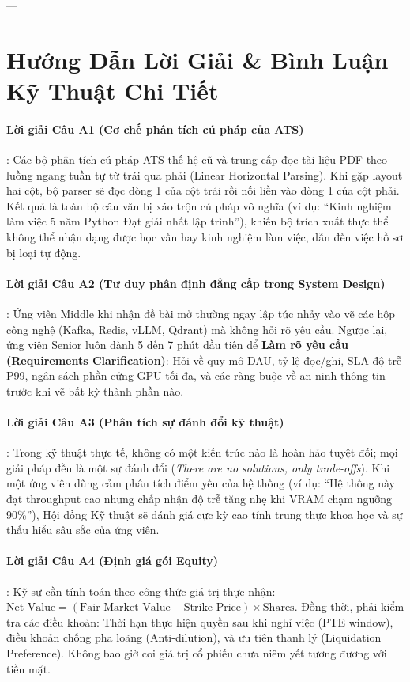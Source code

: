 ---

\section{Hướng Dẫn Lời Giải \& Bình Luận Kỹ Thuật Chi Tiết}
\label{sec:ch15-solutions}

\paragraph{Lời giải Câu A1 (Cơ chế phân tích cú pháp của ATS)}:
Các bộ phân tích cú pháp ATS thế hệ cũ và trung cấp đọc tài liệu PDF theo luồng ngang tuần tự từ trái qua phải (Linear Horizontal Parsing).
Khi gặp layout hai cột, bộ parser sẽ đọc dòng 1 của cột trái rồi nối liền vào dòng 1 của cột phải. Kết quả là toàn bộ câu văn bị xáo trộn cú pháp vô nghĩa (ví dụ: ``Kinh nghiệm làm việc 5 năm Python Đạt giải nhất lập trình''), khiến bộ trích xuất thực thể không thể nhận dạng được học vấn hay kinh nghiệm làm việc, dẫn đến việc hồ sơ bị loại tự động.

\paragraph{Lời giải Câu A2 (Tư duy phân định đẳng cấp trong System Design)}:
Ứng viên Middle khi nhận đề bài mở thường ngay lập tức nhảy vào vẽ các hộp công nghệ (Kafka, Redis, vLLM, Qdrant) mà không hỏi rõ yêu cầu.
Ngược lại, ứng viên Senior luôn dành 5 đến 7 phút đầu tiên để \textbf{Làm rõ yêu cầu (Requirements Clarification)}: Hỏi về quy mô DAU, tỷ lệ đọc/ghi, SLA độ trễ P99, ngân sách phần cứng GPU tối đa, và các ràng buộc về an ninh thông tin trước khi vẽ bất kỳ thành phần nào.

\paragraph{Lời giải Câu A3 (Phân tích sự đánh đổi kỹ thuật)}:
Trong kỹ thuật thực tế, không có một kiến trúc nào là hoàn hảo tuyệt đối; mọi giải pháp đều là một sự đánh đổi (\textit{There are no solutions, only trade-offs}).
Khi một ứng viên dũng cảm phân tích điểm yếu của hệ thống (ví dụ: ``Hệ thống này đạt throughput cao nhưng chấp nhận độ trễ tăng nhẹ khi VRAM chạm ngưỡng 90\%''), Hội đồng Kỹ thuật sẽ đánh giá cực kỳ cao tính trung thực khoa học và sự thấu hiểu sâu sắc của ứng viên.

\paragraph{Lời giải Câu A4 (Định giá gói Equity)}:
Kỹ sư cần tính toán theo công thức giá trị thực nhận: $\text{Net Value} = (\text{Fair Market Value} - \text{Strike Price}) \times \text{Shares}$. Đồng thời, phải kiểm tra các điều khoản: Thời hạn thực hiện quyền sau khi nghỉ việc (PTE window), điều khoản chống pha loãng (Anti-dilution), và ưu tiên thanh lý (Liquidation Preference). Không bao giờ coi giá trị cổ phiếu chưa niêm yết tương đương với tiền mặt.

